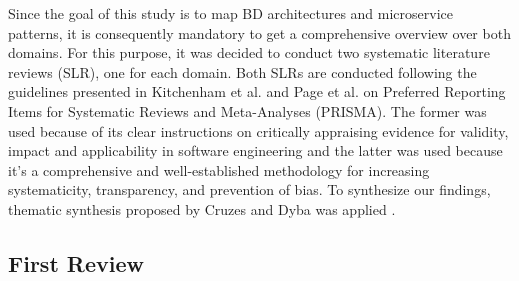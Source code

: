 \documentclass{bmcart}
\begin{document}
Since the goal of this study is to map BD architectures and microservice patterns, it is consequently mandatory to get a comprehensive overview over both domains. For this purpose, it was decided to conduct two systematic literature reviews (SLR), one for each domain. Both SLRs are conducted following the guidelines presented in Kitchenham et al. \cite{Kitchenham.2004} and Page et al. \cite{Page.2021} on Preferred Reporting Items for Systematic Reviews and Meta-Analyses (PRISMA). The former was used because of its clear instructions on critically appraising evidence for validity, impact and applicability in software engineering and the latter was used because it's a comprehensive and well-established methodology for increasing systematicity, transparency, and prevention of bias. To synthesize our findings, thematic synthesis proposed by Cruzes and Dyba was applied \cite{Cruzes.2011}. 








\subsection{First Review} \label{firstReview}
\end{document}
